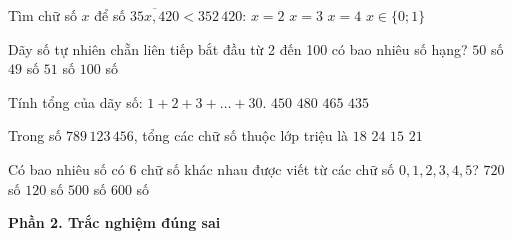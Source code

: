 \begin{ex} %
Tìm chữ số $x$ để số $\overline{35x,420} < 352\,420$:
\choice
{$x = 2$}
{$x = 3$}
{$x = 4$}
{\True $x \in \{0; 1\}$}
\end{ex}

\begin{ex} %
Dãy số tự nhiên chẵn liên tiếp bắt đầu từ 2 đến 100 có bao nhiêu số hạng?
\choice
{\True $50$ số}
{$49$ số}
{$51$ số}
{$100$ số}
\end{ex}

\begin{ex} %
Tính tổng của dãy số: $1 + 2 + 3 + \dots + 30$.
\choice
{$450$}
{$480$}
{\True $465$}
{$435$}
\end{ex}

\begin{ex} %
Trong số $789\,123\,456$, tổng các chữ số thuộc lớp triệu là
\choice
{$18$}
{\True $24$}
{$15$}
{$21$}
\end{ex}

\begin{ex} %
Có bao nhiêu số có 6 chữ số khác nhau được viết từ các chữ số $0, 1, 2, 3, 4, 5$?
\choice
{$720$ số}
{$120$ số}
{$500$ số}
{\True $600$ số}
\end{ex}

\textbf{Phần 2. Trắc nghiệm đúng sai}

